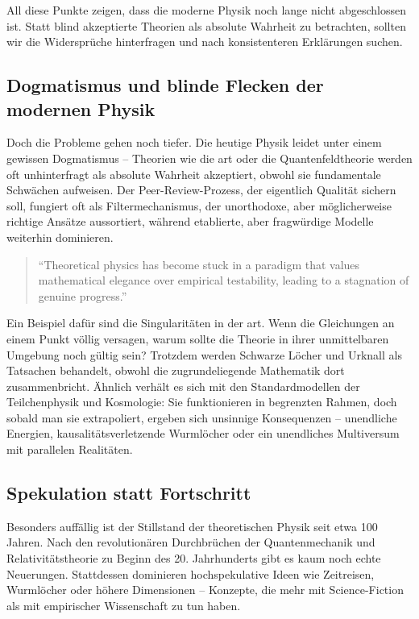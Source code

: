 All diese Punkte zeigen, dass die moderne Physik noch lange nicht abgeschlossen ist. Statt blind akzeptierte Theorien als absolute Wahrheit zu betrachten, sollten wir die
Widersprüche hinterfragen und nach konsistenteren Erklärungen suchen.

\subsection{Dogmatismus und blinde Flecken der modernen Physik}
Doch die Probleme gehen noch tiefer. Die heutige Physik leidet unter einem gewissen Dogmatismus – Theorien wie die \gls{art} oder die Quantenfeldtheorie werden oft unhinterfragt
als absolute Wahrheit akzeptiert, obwohl sie fundamentale Schwächen aufweisen. Der Peer-Review-Prozess, der eigentlich Qualität sichern soll, fungiert oft als Filtermechanismus,
der unorthodoxe, aber möglicherweise richtige Ansätze aussortiert, während etablierte, aber fragwürdige Modelle weiterhin dominieren.
\begin{quote}
    \enquote{Theoretical physics has become stuck in a paradigm that values mathematical elegance over empirical testability, leading to a stagnation of genuine progress.} \cite{Smolin2006}
\end{quote}
Ein Beispiel dafür sind die Singularitäten in der \gls{art}. Wenn die Gleichungen an einem Punkt völlig versagen, warum sollte die Theorie in ihrer unmittelbaren Umgebung noch gültig sein?
Trotzdem werden Schwarze Löcher und Urknall als Tatsachen behandelt, obwohl die zugrundeliegende Mathematik dort zusammenbricht. Ähnlich verhält es sich mit den Standardmodellen der
Teilchenphysik und Kosmologie: Sie funktionieren in begrenzten Rahmen, doch sobald man sie extrapoliert, ergeben sich unsinnige Konsequenzen – unendliche Energien, kausalitätsverletzende
Wurmlöcher oder ein unendliches Multiversum mit parallelen Realitäten.

\subsection{Spekulation statt Fortschritt}
Besonders auffällig ist der Stillstand der theoretischen Physik seit etwa 100 Jahren. Nach den revolutionären Durchbrüchen der Quantenmechanik und Relativitätstheorie zu Beginn des
20. Jahrhunderts gibt es kaum noch echte Neuerungen. Stattdessen dominieren hochspekulative Ideen wie Zeitreisen, Wurmlöcher oder höhere Dimensionen – Konzepte, die mehr mit
Science-Fiction als mit empirischer Wissenschaft zu tun haben.

